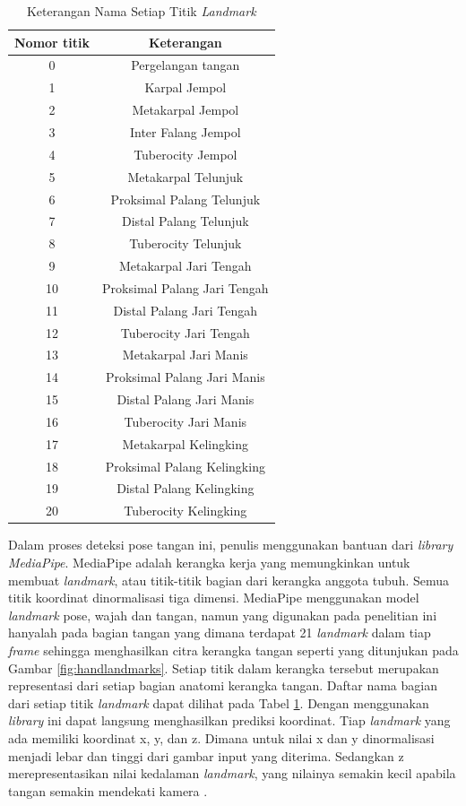 \begin{longtable}{|c|c|}
  \caption{Keterangan Nama Setiap Titik \emph{Landmark}}
  \label{tb:keterangansetiaptitiklandmark}\\
  \hline
  \textbf{Nomor titik} & \textbf{Keterangan} \\
  \hline
  \endhead
  0   & Pergelangan tangan  \\
  1   & Karpal Jempol   \\
  2   & Metakarpal Jempol   \\
  3   & Inter Falang Jempol  \\
  4   & Tuberocity Jempol  \\
  5   & Metakarpal Telunjuk  \\
  6   & Proksimal Palang Telunjuk  \\
  7   & Distal Palang Telunjuk  \\
  8   & Tuberocity Telunjuk  \\
  9   & Metakarpal Jari Tengah  \\
  10  & Proksimal Palang Jari Tengah  \\
  11  & Distal Palang Jari Tengah  \\
  12  & Tuberocity Jari Tengah  \\
  13  & Metakarpal Jari Manis  \\
  14  & Proksimal Palang Jari Manis  \\
  15  & Distal Palang Jari Manis  \\
  16  & Tuberocity Jari Manis  \\
  17  & Metakarpal Kelingking  \\
  18  & Proksimal Palang Kelingking  \\
  19  & Distal Palang Kelingking  \\
  20  & Tuberocity Kelingking  \\
  \hline
\end{longtable}

Dalam proses deteksi pose tangan ini, penulis menggunakan bantuan dari \emph{\emph{library} MediaPipe}. MediaPipe adalah kerangka kerja yang memungkinkan untuk membuat \emph{landmark}, atau titik-titik bagian dari kerangka anggota tubuh. Semua titik koordinat dinormalisasi tiga dimensi. MediaPipe menggunakan model \emph{landmark} pose, wajah dan tangan, namun yang digunakan pada penelitian ini hanyalah pada bagian tangan yang dimana terdapat 21 \emph{landmark} dalam tiap \emph{frame} sehingga menghasilkan citra kerangka tangan seperti yang ditunjukan pada Gambar \ref{fig:handlandmarks}. Setiap titik dalam kerangka tersebut merupakan representasi dari setiap bagian anatomi kerangka tangan. Daftar nama bagian dari setiap titik \emph{landmark} dapat dilihat pada Tabel \ref{tb:keterangansetiaptitiklandmark}. Dengan menggunakan \emph{\emph{library}} ini dapat langsung menghasilkan prediksi koordinat. Tiap \emph{landmark} yang ada memiliki koordinat x, y, dan z. Dimana untuk nilai x dan y dinormalisasi menjadi lebar dan tinggi dari gambar input yang diterima. Sedangkan z merepresentasikan nilai kedalaman \emph{landmark}, yang nilainya semakin kecil apabila tangan semakin mendekati kamera \parencite{Indriani2021}.

